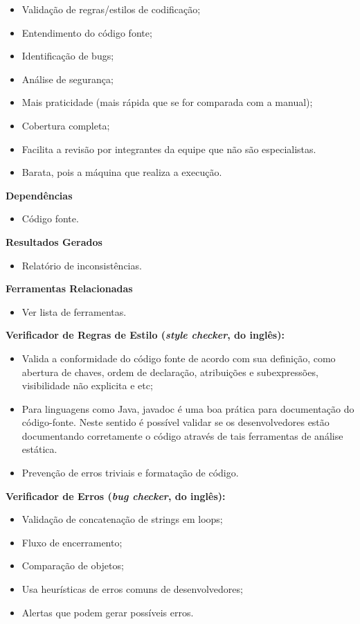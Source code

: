 \begin{itemize}
    \item Validação de regras/estilos de codificação;
    \item Entendimento do código fonte;
    \item Identificação de bugs;
    \item Análise de segurança;
    \item Mais praticidade (mais rápida que se for comparada com a manual);
    \item Cobertura completa;
    \item Facilita a revisão por integrantes da equipe que não são especialistas.
    \item Barata, pois a máquina que realiza a execução.
\end{itemize}

\textbf{ Dependências }
\begin{itemize}
    \item Código fonte.
\end{itemize}

\textbf{ Resultados Gerados }
\begin{itemize}
    \item Relatório de inconsistências.
\end{itemize}

\textbf{ Ferramentas Relacionadas }
\begin{itemize}
    \item Ver lista de ferramentas.
\end{itemize}

\textbf{ Verificador de Regras de Estilo (\textit{style checker}, do inglês): }
\begin{itemize}
    \item Valida a conformidade do código fonte de acordo com sua definição, como abertura de chaves, ordem de declaração, atribuições e subexpressões, visibilidade não explicita e etc;
    \item Para linguagens como Java, javadoc é uma boa prática para documentação do código-fonte. Neste sentido é possível validar se os desenvolvedores estão documentando corretamente o código através de tais ferramentas de análise estática.
    \item Prevenção de erros triviais e formatação de código.
\end{itemize}

\textbf{Verificador de Erros (\textit{bug checker}, do inglês):}

\begin{itemize}
    \item Validação de concatenação de strings em loops;
    \item Fluxo de encerramento;
    \item Comparação de objetos;
    \item Usa heurísticas de erros comuns de desenvolvedores;
    \item Alertas que podem gerar possíveis erros.
\end{itemize}

